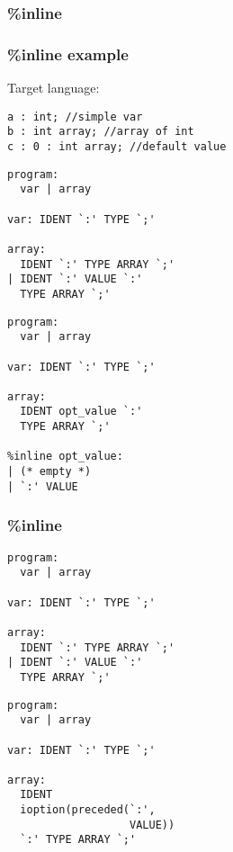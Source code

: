 \begin{frame}
  \frametitle{\%inline}
  \usebox{\codebox}
\end{frame}


\begin{frame}[fragile]
  \frametitle{\%inline example}
  Target language:
  \begin{verbatim}
a : int; //simple var
b : int array; //array of int
c : 0 : int array; //default value
\end{verbatim}
\end{frame}

\lstset{basicstyle=\ttfamily\scriptsize}
\begin{lrbox}{\codebox}
  \begin{tcolorbox}[title=\centering{\%inline}\\Bison\hspace{0.45\linewidth} Menhir,sidebyside]%
  \begin{lstlisting}
program:
  var | array

var: IDENT `:' TYPE `;'

array:
  IDENT `:' TYPE ARRAY `;'
| IDENT `:' VALUE `:'
  TYPE ARRAY `;'
\end{lstlisting}
\tcblower%
  \begin{lstlisting}
program:
  var | array

var: IDENT `:' TYPE `;'

array:
  IDENT opt_value `:'
  TYPE ARRAY `;'

%inline opt_value:
| (* empty *)
| `:' VALUE
  \end{lstlisting}
  \end{tcolorbox}
\end{lrbox}

\begin{frame}
  \frametitle{\%inline}
  \usebox{\codebox}
\end{frame}


\begin{lrbox}{\codebox}
  \begin{tcolorbox}[title=\centering{\%inline}\\Bison\hspace{0.45\linewidth} Menhir,sidebyside]%
  \begin{lstlisting}
program:
  var | array

var: IDENT `:' TYPE `;'

array:
  IDENT `:' TYPE ARRAY `;'
| IDENT `:' VALUE `:'
  TYPE ARRAY `;'
\end{lstlisting}
\tcblower%
  \begin{lstlisting}
program:
  var | array

var: IDENT `:' TYPE `;'

array:
  IDENT
  ioption(preceded(`:',
                   VALUE))
  `:' TYPE ARRAY `;'
  \end{lstlisting}
  \end{tcolorbox}
\end{lrbox}


